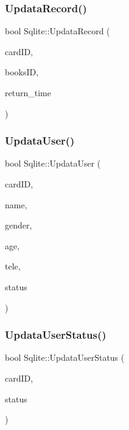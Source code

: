 \mbox{\label{class_sqlite_a5cb753f7b603cc450ef9527bf96d51f1}} 
\subsubsection{\texorpdfstring{UpdataRecord()}{UpdataRecord()}}
{\footnotesize\ttfamily bool Sqlite\+::\+Updata\+Record (\begin{DoxyParamCaption}\item[{Q\+String}]{card\+ID,  }\item[{Q\+String}]{books\+ID,  }\item[{Q\+String}]{return\+\_\+time }\end{DoxyParamCaption})}

\mbox{\label{class_sqlite_a7909130f3bbef819bd808c49c9249e2c}} 
\subsubsection{\texorpdfstring{UpdataUser()}{UpdataUser()}}
{\footnotesize\ttfamily bool Sqlite\+::\+Updata\+User (\begin{DoxyParamCaption}\item[{Q\+String}]{card\+ID,  }\item[{Q\+String}]{name,  }\item[{Q\+String}]{gender,  }\item[{int}]{age,  }\item[{Q\+String}]{tele,  }\item[{bool}]{status }\end{DoxyParamCaption})}

\mbox{\label{class_sqlite_a9827a7be15c19a7ecc943b701baa932b}} 
\subsubsection{\texorpdfstring{UpdataUserStatus()}{UpdataUserStatus()}}
{\footnotesize\ttfamily bool Sqlite\+::\+Updata\+User\+Status (\begin{DoxyParamCaption}\item[{Q\+String}]{card\+ID,  }\item[{bool}]{status }\end{DoxyParamCaption})}



